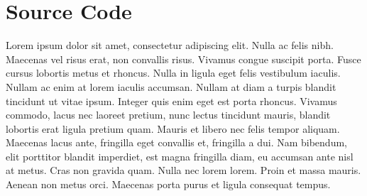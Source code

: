 \documentclass[12pt]{article}
\begin{document}
  \section{Source Code}
    Lorem ipsum dolor sit amet, consectetur adipiscing elit. Nulla ac felis nibh. Maecenas vel risus erat, non convallis risus. Vivamus congue suscipit porta. Fusce cursus lobortis metus et rhoncus. Nulla in ligula eget felis vestibulum iaculis. Nullam ac enim at lorem iaculis accumsan. Nullam at diam a turpis blandit tincidunt ut vitae ipsum. Integer quis enim eget est porta rhoncus. Vivamus commodo, lacus nec laoreet pretium, nunc lectus tincidunt mauris, blandit lobortis erat ligula pretium quam. Mauris et libero nec felis tempor aliquam. Maecenas lacus ante, fringilla eget convallis et, fringilla a dui. Nam bibendum, elit porttitor blandit imperdiet, est magna fringilla diam, eu accumsan ante nisl at metus. Cras non gravida quam. Nulla nec lorem lorem. Proin et massa mauris. Aenean non metus orci. Maecenas porta purus et ligula consequat tempus.
\end{document}

